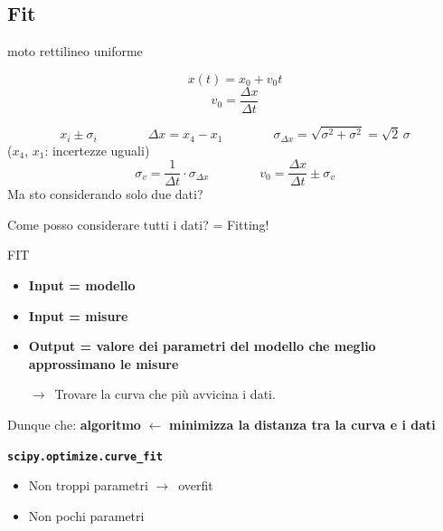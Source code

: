 \documentclass[11pt,a4paper,oneside]{book}
\newcommand{\grigio}[1]{{\color{grigio}#1}}
\newcommand{\fr}{\ensuremath{\rightarrow}}
\newcommand{\giu}{\ensuremath{\hookrightarrow}}
\newcommand{\chiave}[1]{\textbf{#1}}
\begin{document}
\subsection*{Fit}
\begin{esempio}{moto rettilineo uniforme}{}
\leavevmode\par
\begin{minipage}[c]{0.4\linewidth}
\[
  x(t) = x_0 + v_0 t
\]
\[
  v_0 = \frac{\Delta x}{\Delta t}
\]
\end{minipage}\hfill
\begin{minipage}[c]{0.55\linewidth}
\centering
{}
\end{minipage}
\[
  x_i \pm \sigma_i \qquad\qquad \Delta x = x_4 - x_1 \qquad\qquad \sigma_{\Delta x} = \sqrt{\sigma^2 + \sigma^2} = \sqrt{2}\, \sigma
\]
\grigio{($x_4$, $x_1$: incertezze uguali)}
\[
  \sigma_v = \frac{1}{\Delta t} \cdot \sigma_{\Delta x} \qquad\qquad v_0 = \frac{\Delta x}{\Delta t} \pm \sigma_v
\]
Ma sto considerando solo due dati?
\end{esempio}

Come posso considerare tutti i dati? = Fitting!

FIT
\begin{itemize}[label=\giu]
  \item \chiave{Input = modello}
  \item \chiave{Input = misure}
  \item \chiave{Output = valore dei parametri del modello che meglio approssimano le misure}

  \fr\ Trovare la curva che più avvicina i dati.
\end{itemize}
Dunque che: \chiave{algoritmo} $\leftarrow$ \chiave{minimizza la distanza tra la curva e i dati}

\chiave{\texttt{scipy.optimize.curve\_fit}}
\begin{itemize}[label=\fr]
  \item Non troppi parametri \fr\ overfit
  \item Non pochi parametri
\end{itemize}
\end{document}

